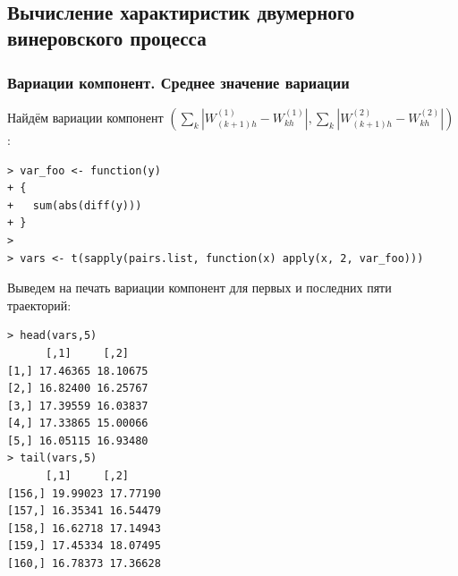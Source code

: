 \documentclass[14pt,a4paper]{scrartcl}
\begin{document}
\begin{figure}[H]
\begin{minipage}[h]{.7\linewidth}
	\end{minipage}
	\begin{minipage}[h]{.7\linewidth}
		  \\
	\end{minipage}
\end{figure}



\pagebreak


\subsection{Вычисление характиристик двумерного винеровского процесса}

\subsubsection{Вариации компонент. Среднее значение вариации}

Найдём вариации компонент  $\left(\sum\limits_{k}\left|W_{(k+1) h}^{(1)}-W_{k h}^{(1)}\right|, \sum\limits_{k}\left|W_{(k+1) h}^{(2)}-W_{k h}^{(2)}\right|\right)$:
\begin{verbatim}
> var_foo <- function(y)
+ {
+   sum(abs(diff(y)))
+ }
> 
> vars <- t(sapply(pairs.list, function(x) apply(x, 2, var_foo)))
\end{verbatim}


Выведем на печать вариации компонент для первых и последних пяти траекторий:
\begin{verbatim}
> head(vars,5)
	  [,1]     [,2]
[1,] 17.46365 18.10675
[2,] 16.82400 16.25767
[3,] 17.39559 16.03837
[4,] 17.33865 15.00066
[5,] 16.05115 16.93480
> tail(vars,5)
	  [,1]     [,2]
[156,] 19.99023 17.77190
[157,] 16.35341 16.54479
[158,] 16.62718 17.14943
[159,] 17.45334 18.07495
[160,] 16.78373 17.36628
\end{verbatim}
\end{document}
